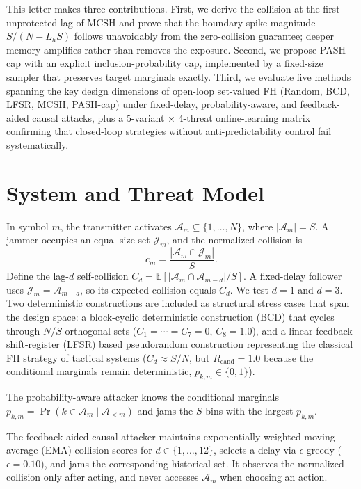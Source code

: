 \documentclass[letterpaper,journal,10pt]{IEEEtran}
\begin{document}
This letter makes three contributions. First, we derive the collision at the
first unprotected lag of MCSH and prove
that the boundary-spike magnitude $S/(N-L_hS)$ follows unavoidably from the
zero-collision guarantee; deeper memory amplifies rather than removes the
exposure. Second, we propose PASH-cap with an explicit inclusion-probability
cap, implemented by a fixed-size sampler that preserves target marginals
exactly. Third, we evaluate five methods spanning the key design dimensions of
open-loop set-valued FH (Random, BCD, LFSR, MCSH, PASH-cap) under fixed-delay,
probability-aware, and feedback-aided causal attacks, plus a 5-variant
$\times$ 4-threat online-learning matrix confirming that closed-loop
strategies without anti-predictability control fail systematically.

\section{System and Threat Model}
In symbol $m$, the transmitter activates
$\mathcal A_m\subseteq\{1,\ldots,N\}$, where $|\mathcal A_m|=S$. A jammer
occupies an equal-size set $\mathcal J_m$, and the normalized collision is
\begin{equation}
 c_m=\frac{|\mathcal A_m\cap\mathcal J_m|}{S}.
\end{equation}
Define the lag-$d$ self-collision
$C_d=\mathbb E[|\mathcal A_m\cap\mathcal A_{m-d}|/S]$. A fixed-delay follower
uses $\mathcal J_m=\mathcal A_{m-d}$, so its expected collision equals $C_d$.
We test $d=1$ and $d=3$. Two deterministic constructions are included
as structural stress cases that span the design space: a block-cyclic
deterministic construction (BCD) that cycles through $N/S$ orthogonal
sets ($C_1{=}\cdots{=}C_7{=}0$, $C_8{=}1.0$), and a linear-feedback-shift-register (LFSR) based
pseudorandom construction representing the classical FH strategy of
tactical systems ($C_d{\approx}S/N$, but $R_{\mathrm{cand}}{=}1.0$ because the
conditional marginals remain deterministic, $p_{k,m}{\in}\{0,1\}$).

The probability-aware attacker knows the conditional marginals
$p_{k,m}=\Pr(k\in\mathcal A_m\mid\mathcal A_{<m})$
and jams the $S$ bins with the largest $p_{k,m}$.

The feedback-aided causal attacker maintains exponentially weighted
moving average (EMA) collision scores for
$d\in\{1,\ldots,12\}$, selects a delay via $\epsilon$-greedy ($\epsilon{=}0.10$), and jams the
corresponding historical set. It observes the normalized collision only
after acting, and never accesses $\mathcal A_m$ when choosing an action.
\end{document}
